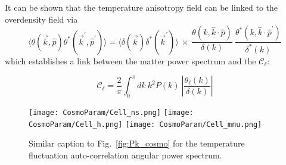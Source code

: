 It can be shown that the temperature anisotropy field can be linked to the overdensity field via
\begin{equation}
\langle \theta(\vec{k}, \hat{p}) \theta^{\ast}(\vec{k}^\prime, \hat{p}^\prime) \rangle = \langle \delta(\vec{k}) \delta^{\ast} (\vec{k}^\prime) \rangle ~\times~ \frac{\theta(k, \hat{k}\cdot \hat{p})}{\delta(k)}~\frac{\theta^{\ast}(k, \hat{k}\cdot \hat{p}^\prime)}{\delta^{\ast}(k)}
\end{equation} which establishes a link between the matter power spectrum and the $\mathcal{C}_\ell$:

\begin{equation}
\mathcal{C}_{\ell} = \frac{2}{\pi} \int_{0}^{\pi} dk~k^2 P(k) ~\left\vert \frac{\theta_{\ell} (k)}{\delta(k)} \right\vert
\end{equation}

\begin{figure}
\begin{center}
\texttt{[image: CosmoParam/Cell\_ns.png]}
\texttt{[image: CosmoParam/Cell\_h.png]}
\texttt{[image: CosmoParam/Cell\_mnu.png]}
\caption{Similar caption to Fig.~\ref{fig:Pk_cosmo} for the temperature fluctuation auto-correlation angular power spectrum.}
\label{fig:Cell_cosmo}
\end{center}
\end{figure}

\clearpage